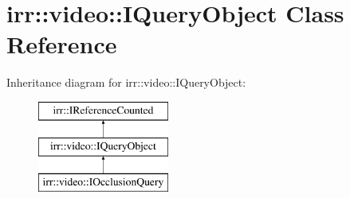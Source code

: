 \hypertarget{classirr_1_1video_1_1IQueryObject}{}\section{irr\+:\+:video\+:\+:I\+Query\+Object Class Reference}
\label{classirr_1_1video_1_1IQueryObject}
Inheritance diagram for irr\+:\+:video\+:\+:I\+Query\+Object\+:\begin{figure}[H]
\begin{center}
\leavevmode
\includegraphics[height=3.000000cm]{classirr_1_1video_1_1IQueryObject}
\end{center}
\end{figure}
